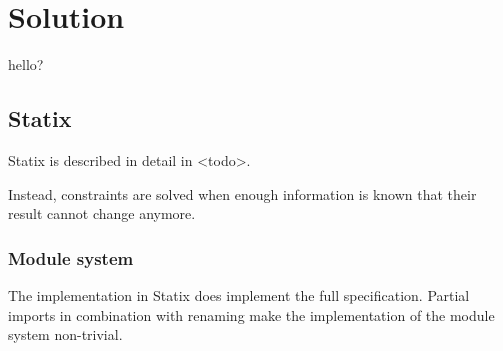 \chapter{\label{chap:solution}Solution}

hello?

\section{\label{sec:solution__statix}Statix}
Statix is described in detail in <todo>.

Instead, constraints are solved when enough information is known that their result cannot change anymore.

\subsection{\label{subsec:solution__statix__module_system}Module system}
The implementation in Statix does implement the full specification.
Partial imports  in combination with renaming make the implementation of the module system non-trivial.


